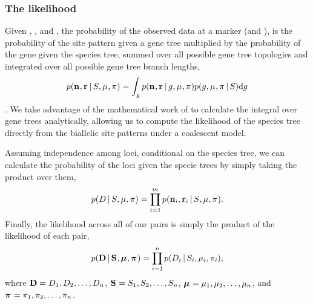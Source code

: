 \subsubsection{The likelihood}

Given \murate, \gfreq, \comparisondivtime and \comparisonpopsizes, the
probability of the observed data at a marker (\allelecount and \redallelecount),
is the probability of the site pattern given a gene tree multiplied by the
probability of the gene given the species tree, summed over all possible gene
tree topologies and integrated over all possible gene tree branch lengths,
\begin{equation}
    \pr(\leafallelecounts, \leafredallelecounts \given \sptree, \murate, \gfreq)
    =
    \int_{\genetree}
    \pr(\leafallelecounts, \leafredallelecounts \given \genetree, \murate, \gfreq)
    \pr(\genetree, \murate, \gfreq \given \sptree)
    \diff{\genetree}
    \label{eq:markerlikelihood}
\end{equation}
\citep{Felsenstein1988,Nielsen2001,Rannala2003}.
We take advantage of the mathematical work of \citep{Bryant2012} to calculate
the integral over gene trees analytically, allowing us to compute the
likelihood of the species tree directly from the biallelic site patterns under
a coalescent model.

Assuming independence among loci, conditional on the species tree, we can
calculate the probability of the \nloci loci given the specie trees by simply
taking the product over them,
\begin{equation}
    \pr(\comparisondata \given \sptree, \murate, \gfreq)
    =
    \prod_{i=1}^{\nloci}
    \pr(\leafallelecounts[i], \leafredallelecounts[i] \given \sptree, \murate, \gfreq).
    \label{eq:comparisonlikelihood}
\end{equation}
Finally, the likelihood across all of our pairs is simply the product of the
likelihood of each pair,
\begin{equation}
    \pr(
    \alldata
    \given
    \sptrees,
    \murates,
    \gfreqs)
    =
    \prod_{i=1}^{\ncomparisons}
    \pr(\comparisondata[i] \given \sptree[i], \murate[i], \gfreq[i]),
    \label{eq:collectionlikelihood}
\end{equation}
where
$\alldata = \comparisondata[1], \comparisondata[2], \ldots, \comparisondata[\ncomparisons]$,
$\sptrees = \sptree[1], \sptree[2], \ldots, \sptree[\ncomparisons]$,
$\murates = \murate[1], \murate[2], \ldots, \murate[\ncomparisons]$,
and
$\gfreqs = \gfreq[1], \gfreq[2], \ldots, \gfreq[\ncomparisons]$.


